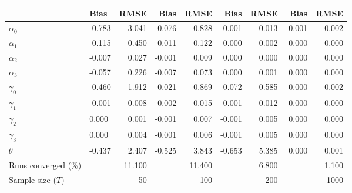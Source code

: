 
\begin{tabular}[t]{llrrrrrrr}
\toprule
  & Bias & RMSE & Bias & RMSE & Bias & RMSE & Bias & RMSE\\
\midrule
$\alpha_{0}$ & -0.783 & 3.041 & -0.076 & 0.828 & 0.001 & 0.013 & -0.001 & 0.002\\
$\alpha_{1}$ & -0.115 & 0.450 & -0.011 & 0.122 & 0.000 & 0.002 & 0.000 & 0.000\\
$\alpha_{2}$ & -0.007 & 0.027 & -0.001 & 0.009 & 0.000 & 0.000 & 0.000 & 0.000\\
$\alpha_{3}$ & -0.057 & 0.226 & -0.007 & 0.073 & 0.000 & 0.001 & 0.000 & 0.000\\
$\gamma_{0}$ & -0.460 & 1.912 & 0.021 & 0.869 & 0.072 & 0.585 & 0.000 & 0.002\\
$\gamma_{1}$ & -0.001 & 0.008 & -0.002 & 0.015 & -0.001 & 0.012 & 0.000 & 0.000\\
$\gamma_{2}$ & 0.000 & 0.001 & -0.001 & 0.007 & -0.001 & 0.005 & 0.000 & 0.000\\
$\gamma_{3}$ & 0.000 & 0.004 & -0.001 & 0.006 & -0.001 & 0.005 & 0.000 & 0.000\\
$\theta$ & -0.437 & 2.407 & -0.525 & 3.843 & -0.653 & 5.385 & 0.000 & 0.001\\
Runs converged (\%) &  & 11.100 &  & 11.400 &  & 6.800 &  & 1.100\\
Sample size ($T$) &  & 50 &  & 100 &  & 200 &  & 1000\\
\bottomrule
\end{tabular}
